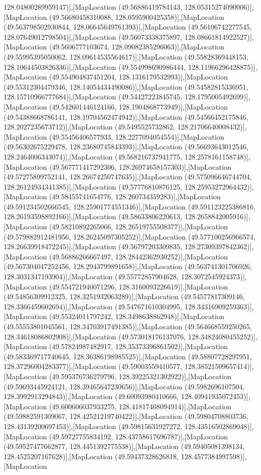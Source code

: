128.04800289959147)],[MapLocation (49.56886419784143, 128.05315274090006)],[MapLocation (49.56680458310088, 128.0595900425358)],[MapLocation (49.563798502930844, 128.06645649761393)],[MapLocation (49.56106742277545, 128.07649012798504)],[MapLocation (49.56073338375897, 128.08661814922527)],[MapLocation (49.5606777103674, 128.09082385296063)],[MapLocation (49.55995395050062, 128.09614535564617)],[MapLocation (49.55828369448153, 128.10644503826336)],[MapLocation (49.554998690986444, 128.11966296428875)],[MapLocation (49.554904837451204, 128.1316179532993)],[MapLocation (49.55312304479346, 128.14054434490086)],[MapLocation (49.54582815336951, 128.15710966777684)],[MapLocation (49.54427223845745, 128.1795005492699)],[MapLocation (49.542601446124166, 128.1904868773949)],[MapLocation (49.54388668786141, 128.19704562474942)],[MapLocation (49.54566452175846, 128.2027235673712)],[MapLocation (49.5495525732862, 128.21706640008432)],[MapLocation (49.55456406577933, 128.2277094054554)],[MapLocation (49.56302675229478, 128.23680745843393)],[MapLocation (49.56693643012546, 128.2464006343074)],[MapLocation (49.568216737941775, 128.2578161158748)],[MapLocation (49.567771417292306, 128.26974658157303)],[MapLocation (49.57275899752141, 128.26674250747635)],[MapLocation (49.575096646744704, 128.26124934341385)],[MapLocation (49.57776810876125, 128.25953272964432)],[MapLocation (49.58455741654776, 128.260734359283)],[MapLocation (49.591234502666545, 128.25901774551346)],[MapLocation (49.591123225386816, 128.26193598892166)],[MapLocation (49.58633806220613, 128.2658842005916)],[MapLocation (49.58210892265066, 128.26519755508377)],[MapLocation (49.579882912481956, 128.26245097305252)],[MapLocation (49.577100256966574, 128.26639918472245)],[MapLocation (49.56797203309835, 128.27309397842362)],[MapLocation (49.56886266667497, 128.28442362930252)],[MapLocation (49.567304047252456, 128.2943799891658)],[MapLocation (49.563741301706926, 128.3031347193904)],[MapLocation (49.55772857904628, 128.3072545924373)],[MapLocation (49.554721940071296, 128.3160093226619)],[MapLocation (49.54856309912325, 128.3251932063289)],[MapLocation (49.54577817309146, 128.3366459602694)],[MapLocation (49.547671610304995, 128.34316909259363)],[MapLocation (49.55324011797242, 128.3498638862948)],[MapLocation (49.55553801045561, 128.34703917491385)],[MapLocation (49.564668559250265, 128.34618086802908)],[MapLocation (49.573018176137076, 128.34824080455252)],[MapLocation (49.57824987482917, 128.35373396861502)],[MapLocation (49.583369717740645, 128.36386198985525)],[MapLocation (49.58807728297951, 128.37296004283377)],[MapLocation (49.59003559410577, 128.38521509657414)],[MapLocation (49.595376736279796, 128.39225321302922)],[MapLocation (49.59693445924121, 128.39465647230656)],[MapLocation (49.5982696107504, 128.3992913294843)],[MapLocation (49.60093980410666, 128.40941935072453)],[MapLocation (49.600606037933275, 128.41817408094914)],[MapLocation (49.59882591309067, 128.42521219740422)],[MapLocation (49.59804708803736, 128.43139200697453)],[MapLocation (49.59815631927272, 128.43516502869048)],[MapLocation (49.59727755834192, 128.43758617696787)],[MapLocation (49.59527477662877, 128.4451392775538)],[MapLocation (49.59405081398134, 128.4525207167628)],[MapLocation (49.59437328626818, 128.4577384997598)],[MapLocation 